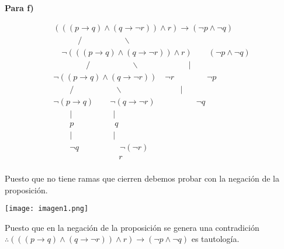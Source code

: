 \textbf{Para f)}
\begin{center}
\[
\begin{array}{c}
(((p \rightarrow q)\land (q \rightarrow \neg r)) \land r) \rightarrow (\neg p \land \neg q) \\
\quad \quad \quad / \quad \quad \quad \quad \quad \backslash \\
\quad \neg (((p \rightarrow q)\land (q \rightarrow \neg r))\land r)  \quad \quad (\neg p \land \neg q)\\
\quad \quad \quad \quad/ \quad \quad \quad \quad \quad  \backslash \quad \quad \quad \quad \quad \quad |\\
\neg ((p \rightarrow q)\land (q \rightarrow \neg r))\quad \neg r  \quad \quad \quad \quad \neg p\\
\quad \quad/ \quad \quad \quad \quad \quad  \backslash \quad \quad \quad \quad \quad \quad \quad |\\
\neg (p \rightarrow q) \quad \quad \neg (q \rightarrow \neg r) \quad  \quad \quad \quad  \quad \neg q \\
\quad \quad |\quad \quad \quad \quad \quad | \quad \quad \quad \quad \quad \quad \quad \quad \\
\quad \quad p\quad \quad \quad \quad \quad q \quad \quad \quad \quad \quad \quad \quad \quad \\
\quad \quad |\quad \quad \quad \quad \quad | \quad \quad \quad \quad \quad \quad \quad \quad \\
\quad \quad \neg q \quad \quad \quad \quad \quad \neg(\neg r) \quad \quad \quad \quad \quad \quad \quad \quad \\
\quad \quad \quad  \quad \quad \quad \quad \quad  r \quad \quad \quad \quad \quad \quad \quad \quad \\

\end{array}
\]
\end{center}

Puesto que no tiene ramas que cierren debemos probar con la negación de la proposición.

\begin{center}
    \texttt{[image: imagen1.png]}\par
\end{center}


Puesto que en la negación de la proposición se genera una contradición 
$\therefore (((p \rightarrow q)\land (q \rightarrow \neg r)) \land r) \rightarrow (\neg p \land \neg q) $ es tautología.\\


